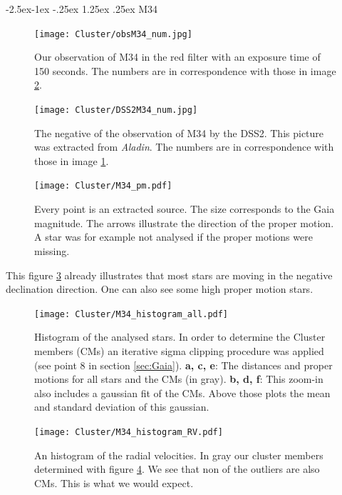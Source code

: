 \documentclass{article}
\makeatletter
\renewcommand\paragraph{\@startsection{paragraph}{4}{\z@}%
            {-2.5ex\@plus -1ex \@minus -.25ex}%
            {1.25ex \@plus .25ex}%
            {\normalfont\normalsize\bfseries}}
\makeatother
\begin{document}
\paragraph{M34}

\begin{figure}[H]
  \centering
    \texttt{[image: Cluster/obsM34\_num.jpg]}
  \caption{Our observation of M34 in the red filter with an exposure time of 150 seconds. The numbers are in correspondence with those in image \ref{fig:DSS2M34_num}.}
  \label{fig:obsM34_num}
\end{figure}

\begin{figure}[H]
  \centering
    \texttt{[image: Cluster/DSS2M34\_num.jpg]}
  \caption{The negative of the observation of M34 by the DSS2. This picture was extracted from \textit{Aladin}. The numbers are in correspondence with those in image \ref{fig:obsM34_num}.}
  \label{fig:DSS2M34_num}
\end{figure}

\begin{figure}[H]
  \centering
    \texttt{[image: Cluster/M34\_pm.pdf]}
  \caption{Every point is an extracted source. The size corresponds to the Gaia magnitude. The arrows illustrate the direction of the proper motion. A star was for example not analysed if the proper motions were missing.}
  \label{fig:M34_pm}
\end{figure}

This figure \ref{fig:M34_pm} already illustrates that most stars are moving in the negative declination direction. One can also see some high proper motion stars.

\begin{figure}[H]
  \centering
    \texttt{[image: Cluster/M34\_histogram\_all.pdf]}
  \caption{Histogram of the analysed stars. In order to determine the Cluster members (CMs) an iterative sigma clipping procedure was applied (see point 8 in section \ref{sec:Gaia}). \textbf{a, c, e}: The distances and proper motions for all stars and the CMs (in gray). \textbf{b, d, f}: This zoom-in also includes a gaussian fit of the CMs. Above those plots the mean and standard deviation of this gaussian.}
  \label{fig:M34_histogram_all}
\end{figure}

\begin{figure}[H]
  \centering
    \texttt{[image: Cluster/M34\_histogram\_RV.pdf]}
  \caption{An histogram of the radial velocities. In gray our cluster members determined with figure \ref{fig:M34_histogram_all}. We see that non of the outliers are also CMs. This is what we would expect.}
  \label{fig:M34_histogram_RV}
\end{figure}
\end{document}
